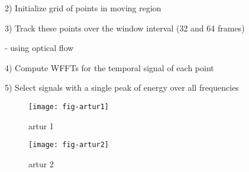 2) Initialize grid of points in moving region

3) Track these points over the window interval (32 and 64 frames)

     - using optical flow

4) Compute WFFTs for the temporal signal of each point

5) Select signals with a single peak of energy over all frequencies 


\begin{figure}[bt]
\texttt{[image: fig-artur1]}
\caption
{
artur 1
}
\label{fig:artur1}
\end{figure}


\begin{figure}[bt]
\texttt{[image: fig-artur2]}
\caption
{
artur 2
}
\label{fig:artur2}
\end{figure}


